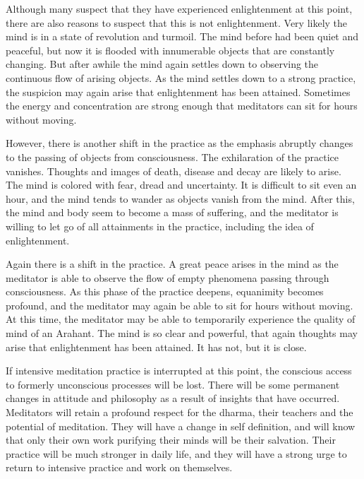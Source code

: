 \documentclass[a5paper,10pt,english]{book}
\begin{document}
\sphinxAtStartPar
Although many suspect that they have experienced enlightenment at this
point, there are also reasons to suspect that this is not enlightenment.
Very likely the mind is in a state of revolution and turmoil. The mind
before had been quiet and peaceful, but now it is flooded with
innumerable objects that are constantly changing. But after awhile the
mind again settles down to observing the continuous flow of arising
objects. As the mind settles down to a strong practice, the suspicion
may again arise that enlightenment has been attained. Sometimes the
energy and concentration are strong enough that meditators can sit for
hours without moving.

\sphinxAtStartPar
However, there is another shift in the practice as the emphasis abruptly
changes to the passing of objects from consciousness. The exhilaration
of the practice vanishes. Thoughts and images of death, disease and
decay are likely to arise. The mind is colored with fear, dread and
uncertainty. It is difficult to sit even an hour, and the mind tends to
wander as objects vanish from the mind. After this, the mind and body
seem to become a mass of suffering, and the meditator is willing to let
go of all attainments in the practice, including the idea of
enlightenment.

\sphinxAtStartPar
Again there is a shift in the practice. A great peace arises in the mind
as the meditator is able to observe the flow of empty phenomena passing
through consciousness. As this phase of the practice deepens, equanimity
becomes profound, and the meditator may again be able to sit for hours
without moving. At this time, the meditator may be able to temporarily
experience the quality of mind of an Arahant. The mind is so clear and
powerful, that again thoughts may arise that enlightenment has been
attained. It has not, but it is close.

\sphinxAtStartPar
If intensive meditation practice is interrupted at this point, the
conscious access to formerly unconscious processes will be lost. There
will be some permanent changes in attitude and philosophy as a result of
insights that have occurred. Meditators will retain a profound respect
for the dharma, their teachers and the potential of meditation. They
will have a change in self definition, and will know that only their own
work purifying their minds will be their salvation. Their practice will
be much stronger in daily life, and they will have a strong urge to
return to intensive practice and work on themselves.
\end{document}
